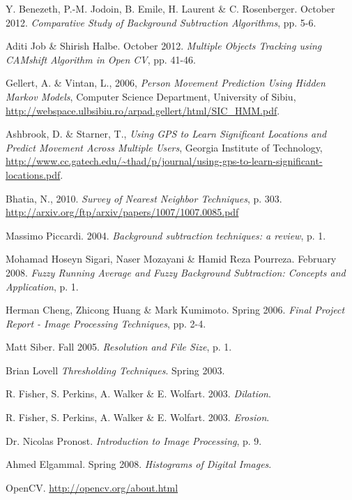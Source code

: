 \begin{thebibliography}{}

 Y. Benezeth, P.-M. Jodoin, B. Emile, H. Laurent \& C. Rosenberger. October 2012. \emph{Comparative Study of Background Subtraction Algorithms}, pp. 5-6.

 Aditi Job \& Shirish Halbe. October 2012. \emph{Multiple Objects Tracking using CAMshift Algorithm in Open CV}, pp. 41-46.

 Gellert, A. \& Vintan, L., 2006, \emph{Person Movement Prediction Using Hidden Markov Models}, Computer Science Department, University of Sibiu, \url{http://webspace.ulbsibiu.ro/arpad.gellert/html/SIC_HMM.pdf}.

 Ashbrook, D. \& Starner, T., \emph{Using GPS to Learn Significant Locations and Predict Movement Across Multiple Users}, Georgia Institute of Technology, \url{http://www.cc.gatech.edu/~thad/p/journal/using-gps-to-learn-significant-locations.pdf}.


 Bhatia, N., 2010. \emph{Survey of Nearest Neighbor Techniques}, p. 303. \url{http://arxiv.org/ftp/arxiv/papers/1007/1007.0085.pdf}


 Massimo Piccardi. 2004. \emph{Background subtraction techniques: a review}, p. 1.

 Mohamad Hoseyn Sigari, Naser Mozayani \& Hamid Reza Pourreza. February 2008. \emph{Fuzzy Running Average and Fuzzy Background Subtraction: Concepts and Application}, p. 1.

 Herman Cheng, Zhicong Huang \& Mark Kumimoto. Spring 2006. \emph{Final Project Report - Image Processing Techniques}, pp. 2-4.

 Matt Siber. Fall 2005. \emph{Resolution and File Size}, p. 1.

 Brian Lovell \emph{Thresholding Techniques}. Spring 2003.

 R. Fisher, S. Perkins, A. Walker \& E. Wolfart. 2003. \emph{Dilation}.

 R. Fisher, S. Perkins, A. Walker \& E. Wolfart. 2003. \emph{Erosion}.

 Dr. Nicolas Pronost. \emph{Introduction to Image Processing}, p. 9.

 Ahmed Elgammal. Spring 2008. \emph{Histograms of Digital Images}.

 OpenCV. \url{http://opencv.org/about.html}






\end{thebibliography}